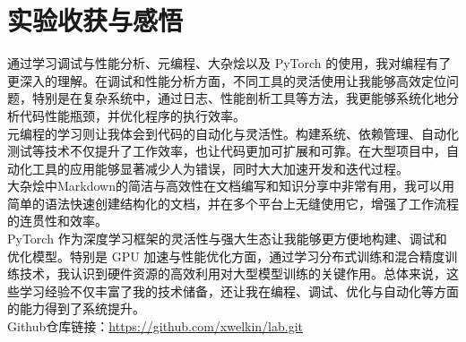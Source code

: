 \documentclass[UTF8,a4paper]{ctexart}
\begin{document}
\begin{sloppypar}
	\section{实验收获与感悟}
	通过学习调试与性能分析、元编程、大杂烩以及 PyTorch 的使用，我对编程有了更深入的理解。在调试和性能分析方面，不同工具的灵活使用让我能够高效定位问题，特别是在复杂系统中，通过日志、性能剖析工具等方法，我更能够系统化地分析代码性能瓶颈，并优化程序的执行效率。\\
	\indent 元编程的学习则让我体会到代码的自动化与灵活性。构建系统、依赖管理、自动化测试等技术不仅提升了工作效率，也让代码更加可扩展和可靠。在大型项目中，自动化工具的应用能够显著减少人为错误，同时大大加速开发和迭代过程。\\
	\indent 大杂烩中Markdown的简洁与高效性在文档编写和知识分享中非常有用，我可以用简单的语法快速创建结构化的文档，并在多个平台上无缝使用它，增强了工作流程的连贯性和效率。\\
	\indent PyTorch 作为深度学习框架的灵活性与强大生态让我能够更方便地构建、调试和优化模型。特别是 GPU 加速与性能优化方面，通过学习分布式训练和混合精度训练技术，我认识到硬件资源的高效利用对大型模型训练的关键作用。总体来说，这些学习经验不仅丰富了我的技术储备，还让我在编程、调试、优化与自动化等方面的能力得到了系统提升。\\
	
	Github仓库链接：\url{https://github.com/xwelkin/lab.git}
	
\end{sloppypar}
\end{document}
